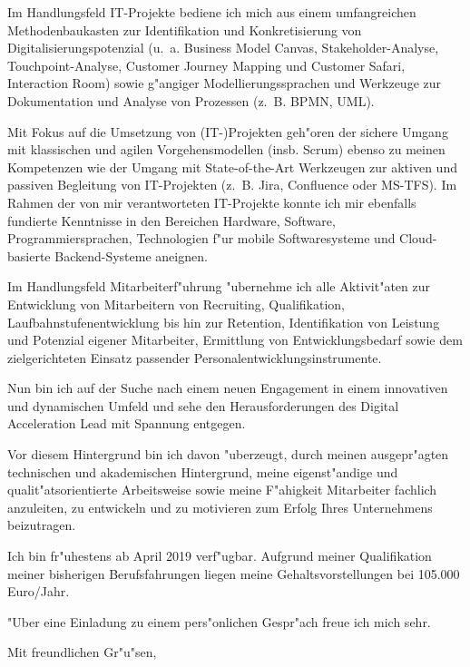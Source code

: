 \documentclass[10pt,a4paper]{dinbrief}
\begin{document}
\begin{letter}
Im Handlungsfeld IT-Projekte bediene ich mich aus einem umfangreichen Methodenbaukasten zur Identifikation und Konkretisierung von Digitalisierungspotenzial (u.~a. Business Model Canvas, Stakeholder-Analyse, Touchpoint-Analyse, Customer Journey Mapping und Customer Safari, Interaction Room) sowie g"angiger Modellierungssprachen und Werkzeuge zur Dokumentation und Analyse von Prozessen (z.~B. BPMN, UML).

Mit Fokus auf die Umsetzung von (IT-)Projekten geh"oren der sichere Umgang mit klassischen und agilen Vorgehensmodellen (insb. Scrum) ebenso zu meinen Kompetenzen wie der Umgang mit State-of-the-Art Werkzeugen zur aktiven und passiven Begleitung von IT-Projekten (z.~B. Jira, Confluence oder MS-TFS). Im Rahmen der von mir verantworteten IT-Projekte konnte ich mir ebenfalls fundierte Kenntnisse in den Bereichen Hardware, Software, Programmiersprachen, Technologien f"ur mobile Softwaresysteme und Cloud-basierte Backend-Systeme aneignen.

Im Handlungsfeld Mitarbeiterf"uhrung "ubernehme ich alle Aktivit"aten zur Entwicklung von Mitarbeitern von Recruiting, Qualifikation, Laufbahnstufenentwicklung bis hin zur Retention, Identifikation von Leistung und Potenzial eigener Mitarbeiter, Ermittlung von Entwicklungsbedarf sowie dem zielgerichteten Einsatz passender Personalentwicklungsinstrumente.

Nun bin ich auf der Suche nach einem neuen Engagement in einem innovativen und dynamischen Umfeld und sehe den Herausforderungen des Digital Acceleration Lead mit Spannung entgegen.

Vor diesem Hintergrund bin ich davon "uberzeugt, durch meinen ausgepr"agten technischen und akademischen Hintergrund, meine eigenst"andige und qualit"atsorientierte Arbeitsweise sowie meine F"ahigkeit Mitarbeiter fachlich anzuleiten, zu entwickeln und zu motivieren zum Erfolg Ihres Unternehmens beizutragen.

Ich bin fr"uhestens ab April 2019 verf"ugbar. Aufgrund meiner Qualifikation meiner bisherigen Berufsfahrungen liegen meine Gehaltsvorstellungen bei 105.000 Euro/Jahr. 

"Uber eine Einladung zu einem pers"onlichen Gespr"ach freue ich mich sehr.

\closing{Mit freundlichen Gr"u"sen,}
\end{letter}
\end{document}
